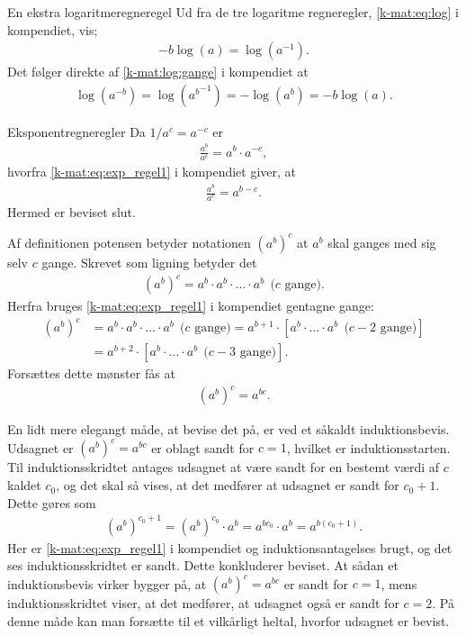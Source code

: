 \begin{opgave}[3]{En ekstra logaritmeregneregel}
Ud fra de tre logaritme regneregler, \cref{k-mat:eq:log} i kompendiet, vis;
%
\begin{align*}
    -b\log(a)=\log(a^{-1}).
\end{align*}
%
Det følger direkte af \cref{k-mat:log:gange} i kompendiet at
%
\begin{align*}
    \log(a^{-b})=\log({a^b}^{-1})=-\log(a^b)=-b\log(a).
\end{align*}
\end{opgave}
\begin{opgave}[4]{Eksponentregneregler}
Da $1/a^c = a^{-c}$ er
%
\begin{align*}
    \frac{a^b}{a^c} = a^b \cdot a^{-c},
\end{align*}
%
hvorfra \cref{k-mat:eq:exp_regel1} i kompendiet giver, at
%
\begin{align*}
    \frac{a^b}{a^c} = a^{b-c}.
\end{align*}
%
Hermed er beviset slut.

Af definitionen potensen betyder notationen $(a^b)^c$ at $a^b$ skal ganges med sig selv $c$ gange. Skrevet som ligning betyder det
%
\begin{align*}
    (a^b)^c = a^b\cdot a^b\cdot \dots{} \cdot a^b~~\text{($c$ gange)}.
\end{align*}
%
Herfra bruges \cref{k-mat:eq:exp_regel1} i kompendiet gentagne gange:
%
\begin{align*}
    (a^b)^c &= a^b\cdot a^b\cdot \dots{} \cdot a^b~~\text{($c$ gange)} = a^{b+1}\cdot \left[ a^b\cdot \dots{} \cdot a^b~~\text{($c-2$ gange)} \right] \\
    &= a^{b+2} \cdot \left[ a^b\cdot \dots{} \cdot a^b~~\text{($c-3$ gange)} \right].
\end{align*}
%
Forsættes dette mønster fås at
%
\begin{align*}
    (a^b)^c = a^{bc}.
\end{align*}

En lidt mere elegangt måde, at bevise det på, er ved et såkaldt induktionsbevis. Udsagnet er $(a^b)^c = a^{bc}$ er oblagt sandt for $c=1$, hvilket er induktionsstarten. Til induktionsskridtet antages udsagnet at være sandt for en bestemt værdi af $c$ kaldet $c_0$, og det skal så vises, at det medfører at udsagnet er sandt for $c_0 + 1$. Dette gøres som
%
\begin{align*}
    (a^b)^{c_0+1} = (a^b)^{c_0} \cdot a^b = a^{bc_0} \cdot a^b = a^{b(c_0+1)}.
\end{align*}
%
Her er \cref{k-mat:eq:exp_regel1} i kompendiet og induktionsantagelses brugt, og det ses induktionsskridtet er sandt. Dette konkluderer beviset. At sådan et induktionsbevis virker bygger på, at $(a^b)^c = a^{bc}$ er sandt for $c=1$, mens induktionsskridtet viser, at det medfører, at udsagnet også er sandt for $c=2$. På denne måde kan man forsætte til et vilkårligt heltal, hvorfor udsagnet er bevist.
\end{opgave}

